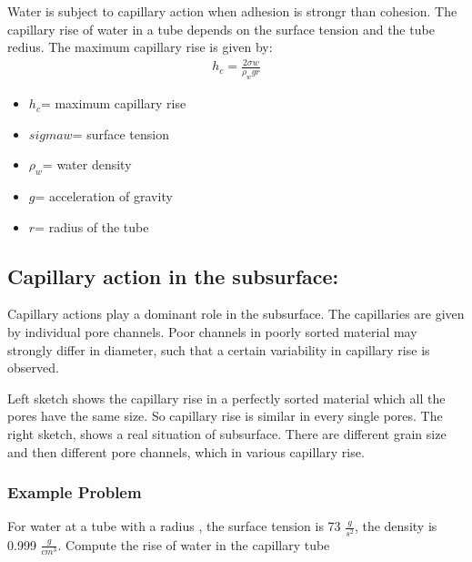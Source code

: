 \documentclass[letterpaper,10pt,english]{sphinxmanual}
\let\sphinxpxdimen\pdfpxdimen\else\newdimen\sphinxpxdimen
\begin{document}
Water is subject to capillary action when adhesion is strongr than cohesion. The capillary rise of water in a tube depends on the surface tension and the tube redius. The maximum capillary rise is given by:
\begin{equation*}
\begin{split}{h_{c}}=\frac{2\sigma{w}}{\rho_{w}{g}{r}}\end{split}
\end{equation*}\begin{itemize}
\item {} 
\({h_{c}}\)= maximum capillary rise

\item {} 
\(sigma{w}\)= surface tension

\item {} 
\(\rho_{w}\)= water density

\item {} 
\({g}\)= acceleration of gravity

\item {} 
\({r}\)= radius of the tube

\end{itemize}


\subsection{Capillary action in the subsurface:}
\label{\detokenize{contents/flow/lecture_02/12_subsurface_structure:capillary-action-in-the-subsurface}}
Capillary actions play a dominant role in the subsurface. The capillaries are given by individual pore channels. Poor channels in poorly sorted material may strongly differ in diameter, such that a certain variability in capillary rise is observed.

\noindent\sphinxincludegraphics[width=600\sphinxpxdimen]{{L02_fig14}.png}

Left sketch shows the capillary rise in a perfectly sorted material which all the pores have the same size. So capillary rise is similar in every single pores. The right sketch, shows a real situation of subsurface. There are different grain size and then different pore channels, which  in various capillary rise.


\subsubsection{Example Problem}
\label{\detokenize{contents/flow/lecture_02/12_subsurface_structure:id2}}
For water at a tube with a radius , the surface tension is 73 \(\frac{g}{s^2}\), the density is 0.999 \(\frac{g}{cm^3}\). Compute the rise of water in the capillary tube
\end{document}
